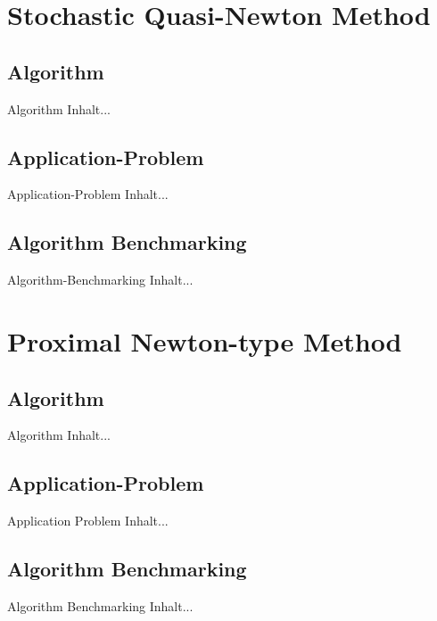 \documentclass[11pt]{beamer}
\begin{document}
	
	\section{Stochastic Quasi-Newton Method}
	\subsection{Algorithm}
	
		\begin{frame}{Algorithm}
			Inhalt...
		\end{frame}
		
	\subsection{Application-Problem}
		
		\begin{frame}{Application-Problem}
			Inhalt...
		\end{frame}
		
	\subsection{Algorithm Benchmarking}
	
		\begin{frame}{Algorithm-Benchmarking}
			Inhalt...
		\end{frame}
	
	
	\section{Proximal Newton-type Method}
	\subsection{Algorithm}
	
		\begin{frame}{Algorithm}
			Inhalt...
		\end{frame}
	
	\subsection{Application-Problem}
	
		\begin{frame}{Application Problem}
			Inhalt...
		\end{frame}
	
	\subsection{Algorithm Benchmarking}
	
		\begin{frame}{Algorithm Benchmarking}
			Inhalt...
		\end{frame}
		
		
\end{document}
